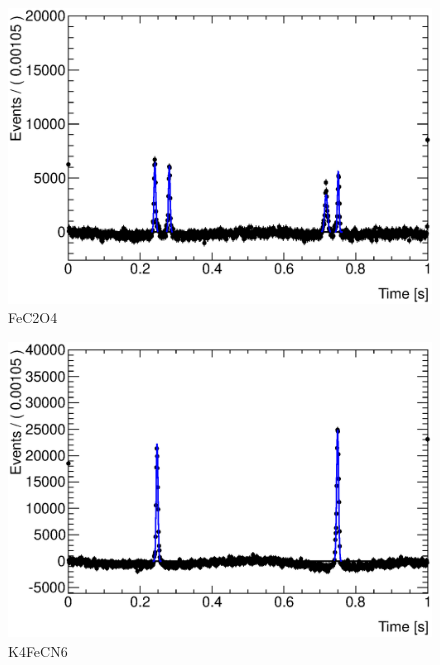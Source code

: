 \begin{figure}[htbp]
    \centering
        \includegraphics[scale=0.37, angle=0]{./FeC2O4_171701_fit}
    \caption{FeC2O4}
    \label{fig:FeC2O4}
\end{figure}

\begin{figure}[htbp]
    \centering
        \includegraphics[scale=0.37, angle=0]{./K4FeCN6_fit}
    \caption{K4FeCN6}
    \label{fig:K4FeCN6}
\end{figure}
